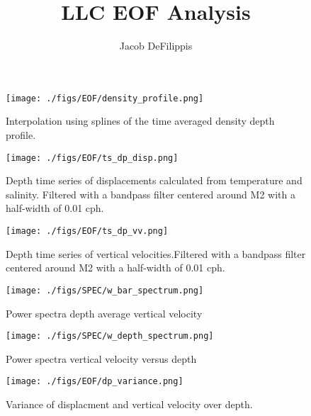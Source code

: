 \documentclass{article}
\begin{document}
\title{LLC EOF Analysis}
\author{Jacob DeFilippis}



\begin{figure}
    \centering
    \texttt{[image: ./figs/EOF/density\_profile.png]}
    \caption{Interpolation using splines of the time averaged density depth profile.}
    \label{depthprof}
\end{figure}

\begin{figure}
    \centering
    \texttt{[image: ./figs/EOF/ts\_dp\_disp.png]}
    \caption{Depth time series of displacements calculated from temperature and salinity. Filtered with a bandpass filter centered around M2 with a half-width of 0.01 cph.}
    \label{ts_d}
\end{figure}

\begin{figure}
    \centering
    \texttt{[image: ./figs/EOF/ts\_dp\_vv.png]}
    \caption{Depth time series of vertical velocities.Filtered with a bandpass filter centered around M2 with a half-width of 0.01 cph. }
    \label{ts_w}
\end{figure}

\begin{figure}
    \centering
    \texttt{[image: ./figs/SPEC/w\_bar\_spectrum.png]}
    \caption{Power spectra depth average vertical velocity}
\end{figure}

\begin{figure}
    \centering
    \texttt{[image: ./figs/SPEC/w\_depth\_spectrum.png]}
    \caption{Power spectra vertical velocity versus depth}
\end{figure}

\begin{figure}
    \centering
    \texttt{[image: ./figs/EOF/dp\_variance.png]}
    \caption{Variance of displacment and vertical velocity over depth.}
\end{figure}
\end{document}
